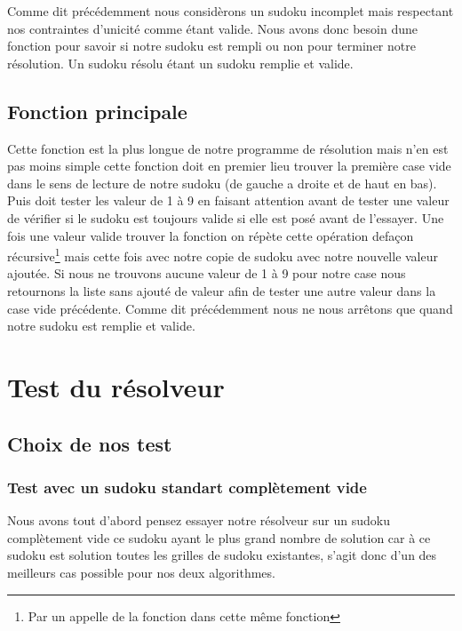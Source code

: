 Comme dit précédemment nous considèrons un sudoku incomplet mais respectant nos contraintes d'unicité comme étant valide. Nous avons donc besoin dune fonction pour savoir si notre sudoku est rempli ou non pour terminer notre résolution. Un sudoku résolu étant un sudoku remplie et valide.\newline

\subsection{Fonction principale}

Cette fonction est la plus longue de notre programme de résolution mais n'en est pas moins simple cette fonction doit en premier lieu trouver la première case vide dans le sens de lecture de notre sudoku (de gauche a droite et de haut en bas).\newline
Puis doit tester les valeur de 1 à 9 en faisant attention avant de tester une valeur de vérifier si le sudoku est toujours valide si elle est posé avant de l'essayer.\newline
Une fois une valeur valide trouver la fonction on répète cette opération defaçon récursive\footnote{Par un appelle de la fonction dans cette même fonction} mais cette fois avec notre copie de sudoku avec notre nouvelle valeur ajoutée.\newline
Si nous ne trouvons aucune valeur de 1 à 9 pour notre case nous retournons la liste sans ajouté de valeur afin de tester une autre valeur dans la case vide précédente.\newline
Comme dit précédemment nous ne nous arrêtons que quand notre sudoku est remplie et valide.\newline

\section{Test du résolveur}

\subsection{Choix de nos test}

\subsubsection{Test avec un sudoku standart complètement vide}

Nous avons tout d'abord pensez essayer notre résolveur sur un sudoku complètement vide ce sudoku ayant le plus grand nombre de solution car à ce sudoku est solution toutes les grilles de sudoku existantes, s'agit donc d'un des meilleurs cas possible pour nos deux algorithmes.

